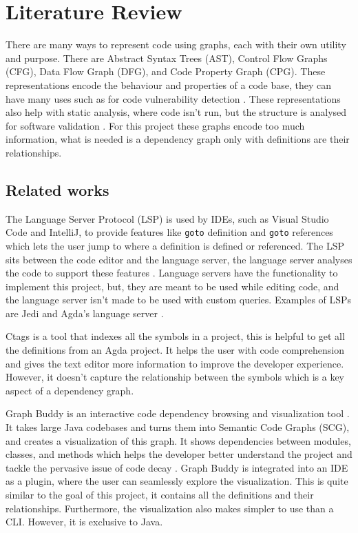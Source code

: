 
\chapter{Literature Review}


There are many ways to represent code using graphs, each with their own utility
and purpose. There are Abstract Syntax Trees (AST), Control Flow Graphs (CFG),
Data Flow Graph (DFG), and Code Property Graph (CPG). These representations
encode the behaviour and properties of a code base, they can have many uses
such as for code vulnerability detection \cite{graph_for_code_vuln}. These
representations also help with static analysis, where code isn't run, but the
structure is analysed for software validation \cite{static_analysis}. For this
project these graphs encode too much information, what is needed is a
dependency graph only with definitions are their relationships.


\section{Related works}

The Language Server Protocol (LSP) is used by IDEs, such as Visual Studio Code
and IntelliJ, to provide features like \texttt{goto} definition and
\texttt{goto} references which lets the user jump to where a definition is
defined or referenced. The LSP sits between the code editor and the language
server, the language server analyses the code to support these features
\cite{LSP_implementation}. Language servers have the functionality to implement
this project, but, they are meant to be used while editing code, and the
language server isn't made to be used with custom queries. Examples of LSPs are
Jedi \cite{jedi_lsp} and Agda's language server \cite{agda_lsp}.

Ctags \cite{ctags} is a tool that indexes all the symbols in a project, this is
helpful to get all the definitions from an Agda project. It helps the user with
code comprehension and gives the text editor more information to improve the
developer experience. However, it doesn't capture the relationship between the
symbols which is a key aspect of a dependency graph.

Graph Buddy is an interactive code dependency browsing and visualization tool
\cite{graph_buddy}. It takes large Java codebases and turns them into Semantic
Code Graphs (SCG), and creates a visualization of this graph. It shows
dependencies between modules, classes, and methods which helps the developer
better understand the project and tackle the pervasive issue of code decay
\cite{code_decay_evidence}. Graph Buddy is integrated into an IDE as a plugin,
where the user can seamlessly explore the visualization. This is quite similar
to the goal of this project, it contains all the definitions and their
relationships. Furthermore, the visualization also makes simpler to use
than a CLI. However, it is exclusive to Java.

